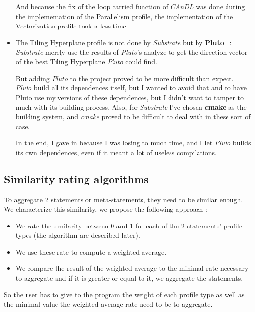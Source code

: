 \documentclass[paper=a4, fontsize=11.5pt]{scrartcl}
\numberwithin{equation}{section}        %
\numberwithin{figure}{section}          %
\numberwithin{table}{section}               %
\begin{document}
\begin{itemize}
            And because the fix of the loop carried function of \textit{CAnDL} was done during
            the implementation of the Parallelism profile, the implementation of the
            Vectorization profile took a less time.
        \item The Tiling Hyperplane profile is not done by \textit{Substrate} but by
            \textbf{Pluto}~\cite{pluto} : \textit{Substrate} merely use the results of
            \textit{Pluto}'s analyze to get the direction vector of the best Tiling Hyperplane
            \textit{Pluto} could find.

            But adding \textit{Pluto} to the project proved to be more difficult than expect.
            \textit{Pluto} build all its dependences itself, but I wanted to avoid that and
            to have Pluto use my versions of these dependences, but I didn't want to tamper
            to much with its building process. Also, for \textit{Substrate} I've chosen \textbf{cmake}
            as the building system, and \textit{cmake} proved to be difficult to deal with in these
            sort of case.

            In the end, I gave in because I was losing to much time, and I let \textit{Pluto} builds
            its own dependences, even if it meant a lot of useless compilations.
    \end{itemize}
    
    \subsection{Similarity rating algorithms}
    To aggregate 2 statements or meta-statements, they need to be similar enough. We characterize
    this similarity, we propose the following approach :
    \begin{itemize}
        \item We rate the similarity between 0 and 1 for each of the 2 statements' profile types
            (the algorithm are described later).
        \item We use these rate to compute a weighted average.
        \item We compare the result of the weighted average to the minimal rate necessary
            to aggregate and if it is greater or equal to it, we aggregate the statements.
    \end{itemize}
    So the user has to give to the program the weight of each profile type as well as the
    minimal value the weighted average rate need to be to aggregate.
\end{document}
